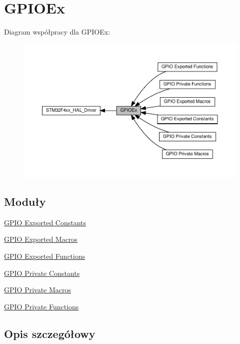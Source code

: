 \hypertarget{group___g_p_i_o_ex}{}\section{G\+P\+I\+O\+Ex}
\label{group___g_p_i_o_ex}
Diagram współpracy dla G\+P\+I\+O\+Ex\+:\nopagebreak
\begin{figure}[H]
\begin{center}
\leavevmode
\includegraphics[width=350pt]{group___g_p_i_o_ex}
\end{center}
\end{figure}
\subsection*{Moduły}
\begin{DoxyCompactItemize}
\item 
\hyperlink{group___g_p_i_o_ex___exported___constants}{G\+P\+I\+O Exported Constants}
\item 
\hyperlink{group___g_p_i_o_ex___exported___macros}{G\+P\+I\+O Exported Macros}
\item 
\hyperlink{group___g_p_i_o_ex___exported___functions}{G\+P\+I\+O Exported Functions}
\item 
\hyperlink{group___g_p_i_o_ex___private___constants}{G\+P\+I\+O Private Constants}
\item 
\hyperlink{group___g_p_i_o_ex___private___macros}{G\+P\+I\+O Private Macros}
\item 
\hyperlink{group___g_p_i_o_ex___private___functions}{G\+P\+I\+O Private Functions}
\end{DoxyCompactItemize}


\subsection{Opis szczegółowy}

